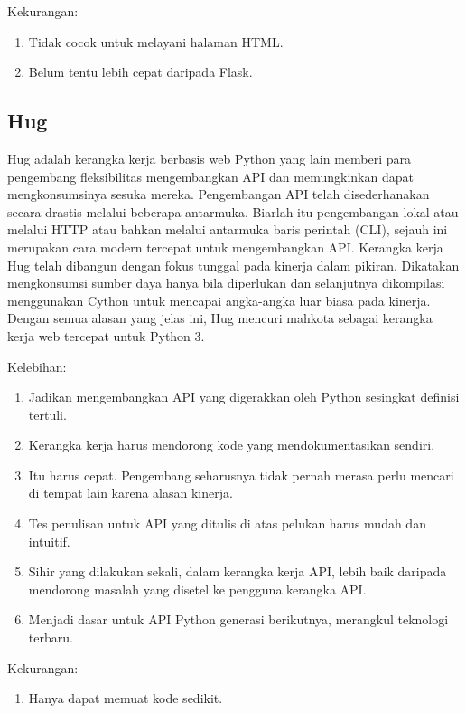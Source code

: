 Kekurangan:
\begin{enumerate}
\item Tidak cocok untuk melayani halaman HTML.
\item Belum tentu lebih cepat daripada Flask.
\end{enumerate}

\subsection{Hug}

Hug adalah kerangka kerja berbasis web Python yang lain memberi para pengembang fleksibilitas mengembangkan API dan memungkinkan dapat mengkonsumsinya sesuka mereka. Pengembangan API telah disederhanakan secara drastis melalui beberapa antarmuka. Biarlah itu pengembangan lokal atau melalui HTTP atau bahkan melalui antarmuka baris perintah (CLI), sejauh ini merupakan cara modern tercepat untuk mengembangkan API. Kerangka kerja Hug telah dibangun dengan fokus tunggal pada kinerja dalam pikiran. Dikatakan mengkonsumsi sumber daya hanya bila diperlukan dan selanjutnya dikompilasi menggunakan Cython untuk mencapai angka-angka luar biasa pada kinerja. Dengan semua alasan yang jelas ini, Hug mencuri mahkota sebagai kerangka kerja web tercepat untuk Python 3.

Kelebihan:
\begin{enumerate}
\item Jadikan mengembangkan API yang digerakkan oleh Python sesingkat definisi tertuli.
\item Kerangka kerja harus mendorong kode yang mendokumentasikan sendiri.
\item Itu harus cepat. Pengembang seharusnya tidak pernah merasa perlu mencari di tempat lain karena alasan kinerja.
\item Tes penulisan untuk API yang ditulis di atas pelukan harus mudah dan intuitif.
\item Sihir yang dilakukan sekali, dalam kerangka kerja API, lebih baik daripada mendorong masalah yang disetel ke pengguna kerangka API.
\item Menjadi dasar untuk API Python generasi berikutnya, merangkul teknologi terbaru.
\end{enumerate}

Kekurangan:
\begin{enumerate}
\item Hanya dapat memuat kode sedikit.
\end{enumerate}

